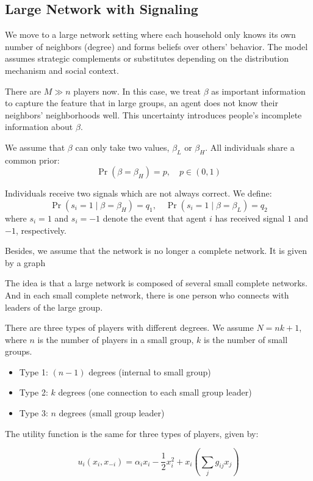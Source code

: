 \documentclass[12pt]{article}
\begin{document}
\subsection{Large Network with Signaling}
We move to a large network setting where each household only knows its own number of neighbors (degree) and forms beliefs over others' behavior. The model assumes strategic complements or substitutes depending on the distribution mechanism and social context.

There are $M \gg n$ players now. In this case, we treat $\beta$ as important information to capture the feature that in large groups, an agent does not know their neighbors' neighborhoods well.  
This uncertainty introduces people's incomplete information about $\beta$.

We assume that $\beta$ can only take two values, $\beta_L$ or $\beta_H$.  
All individuals share a common prior:
\[
\Pr(\beta = \beta_H) = p, \quad p \in (0,1)
\]

Individuals receive two signals which are not always correct.  
We define:
\[
\Pr(s_i = 1 \mid \beta = \beta_H) = q_1, \quad \Pr(s_i = 1 \mid \beta = \beta_L) = q_2
\]
where $s_i = 1$ and $s_i = -1$ denote the event that agent $i$ has received signal $1$ and $-1$, respectively.

Besides, we assume that the network is no longer a complete network.  
It is given by a graph


The idea is that a large network is composed of several small complete networks.  
And in each small complete network, there is one person who connects with leaders of the large group.

There are three types of players with different degrees.  
We assume $N = nk + 1$, where $n$ is the number of players in a small group, $k$ is the number of small groups.

\begin{itemize}
    \item Type 1: $(n-1)$ degrees (internal to small group)
    \item Type 2: $k$ degrees (one connection to each small group leader)
    \item Type 3: $n$ degrees (small group leader)
\end{itemize}

The utility function is the same for three types of players, given by:

\[
u_i(x_i, x_{-i}) = \alpha_i x_i - \frac{1}{2}x_i^2 + x_i\left( \sum_j g_{ij} x_j \right)
\]
\end{document}
